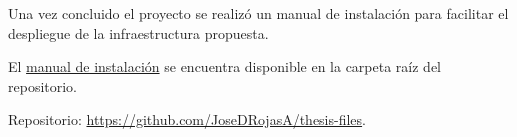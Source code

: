 \newpage
{}\label{appendix:Manual de instalacion}
\noindent Una vez concluido el proyecto se realiz\'o un manual de instalaci\'on para facilitar el despliegue de la infraestructura propuesta.

El \href{https://github.com/JoseDRojasA/thesis-files/raw/master/Manual de instalación.pdf}{manual de instalaci\'on} se encuentra disponible en la carpeta ra\'iz del repositorio.

Repositorio: \url{https://github.com/JoseDRojasA/thesis-files}.
